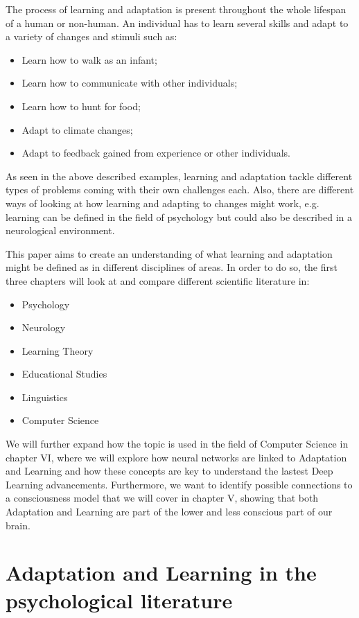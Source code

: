 \documentclass[conference]{IEEEtran}
\begin{document}
	The process of learning and adaptation is present throughout the whole lifespan of a human or non-human. An individual has to learn several skills and adapt to a variety of changes and stimuli such as:
	\begin{itemize}
		\item Learn how to walk as an infant;
		\item Learn how to communicate with other individuals;
		\item Learn how to hunt for food;
		\item Adapt to climate changes;
		\item Adapt to feedback gained from experience or other individuals.
	\end{itemize}

	As seen in the above described examples, learning and adaptation tackle different types of problems coming with their own challenges each. Also, there are different ways of looking at how learning and adapting to changes might work, e.g. learning can be defined in the field of psychology but could also be described in a neurological environment.

	This paper aims to create an understanding of what learning and adaptation might be defined as in different disciplines of areas. In order to do so, the first three chapters will look at and compare different scientific literature in:

	\begin{itemize}
		\item Psychology
		\item Neurology
		\item Learning Theory
		\item Educational Studies
		\item Linguistics
		\item Computer Science
	\end{itemize}
	We will further expand how the topic is used in the field of Computer Science in chapter VI, where we will explore how neural networks are linked to Adaptation and Learning and how these concepts are key to understand the lastest Deep Learning advancements.
	Furthermore, we want to identify possible connections to a consciousness model that we will cover in chapter V, showing that both Adaptation and Learning are part of the lower and less conscious part of our brain.

\section{Adaptation and Learning in the psychological literature}
\end{document}
